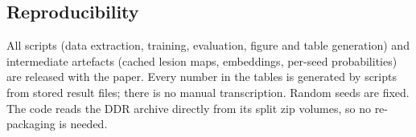 \subsection{Reproducibility}
All scripts (data extraction, training, evaluation, figure and table generation) and intermediate artefacts (cached lesion maps, embeddings, per-seed probabilities) are released with the paper. Every number in the tables is generated by scripts from stored result files; there is no manual transcription. Random seeds are fixed. The code reads the DDR archive directly from its split zip volumes, so no re-packaging is needed.
